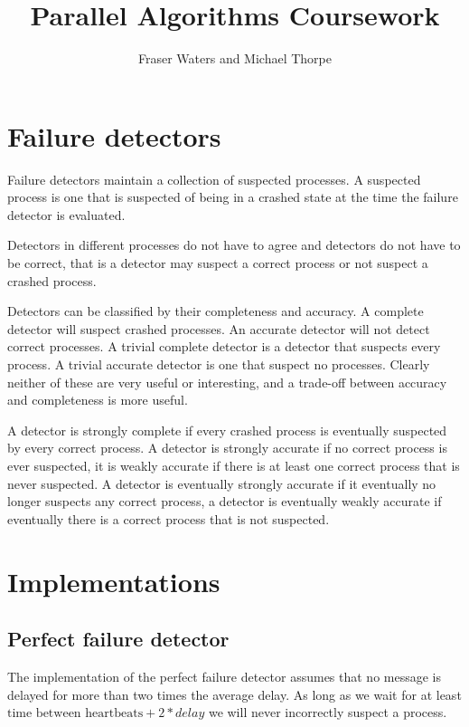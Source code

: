 \documentclass[11pt]{amsart}
\title{Parallel Algorithms Coursework}
\author{Fraser Waters and Michael Thorpe}
\begin{document}
\maketitle

\section{Failure detectors}

Failure detectors maintain a collection of suspected processes. A suspected
process is one that is suspected of being in a crashed state at the time the
failure detector is evaluated.

Detectors in different processes do not have to agree and detectors do not have
to be correct, that is a detector may suspect a correct process or not suspect
a crashed process.

Detectors can be classified by their completeness and accuracy. A complete
detector will suspect crashed processes.  An accurate detector will not detect
correct processes. A trivial complete detector is a detector that suspects
every process. A trivial accurate detector is one that suspect no processes.
Clearly neither of these are very useful or interesting, and a trade-off
between accuracy and completeness is more useful.

A detector is strongly complete if every crashed process is eventually
suspected by every correct process. A detector is strongly accurate if no
correct process is ever suspected, it is weakly accurate if there is at least
one correct process that is never suspected. A detector is eventually strongly
accurate if it eventually no longer suspects any correct process, a detector is
eventually weakly accurate if eventually there is a correct process that is not
suspected. 

\section{Implementations}

\subsection{Perfect failure detector}

The implementation of the perfect failure detector assumes that no message is
delayed for more than two times the average delay. As long as we wait for at
least $\text{time between heartbeats} + 2 * delay$ we will never incorrectly
suspect a process. 
\end{document}
